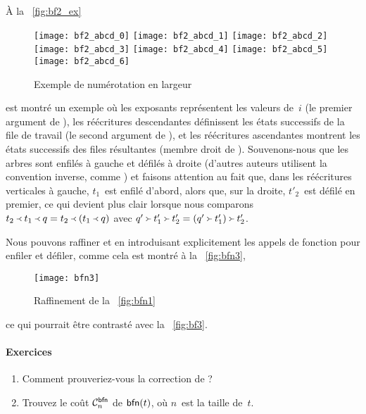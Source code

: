 À la \fig~\vref{fig:bf2_ex}
\begin{figure}
\centering
\texttt{[image: bf2\_abcd\_0]}
\texttt{[image: bf2\_abcd\_1]}
\texttt{[image: bf2\_abcd\_2]}
\texttt{[image: bf2\_abcd\_3]}
\texttt{[image: bf2\_abcd\_4]}
\texttt{[image: bf2\_abcd\_5]}
\texttt{[image: bf2\_abcd\_6]}
\caption{Exemple de numérotation en largeur}
\label{fig:bf2_ex}
\end{figure}
est montré un exemple où les exposants représentent les valeurs
de~\(i\) (le premier argument de
), les réécritures
descendantes définissent les états successifs de la file de travail
(le second argument de ),
et les réécritures ascendantes montrent les états successifs des files
résultantes (membre droit de
). Souvenons-nous que les
arbres sont enfilés à gauche et défilés à droite (d'autres auteurs
utilisent la convention inverse, comme \cite{Okasaki_2000}) et faisons
attention au fait que, dans les réécritures verticales à gauche,
\(t_1\)~est enfilé d'abord, alors que, sur la droite, \(t'_2\)~est
défilé en premier, ce qui devient plus clair lorsque nous comparons
\(\enq{t_2}{\enq{t_1}{q}} =
\enq{t_2}{(\enq{t_1}{q})}\) avec
\(\deq{t'_2}{\deq{t'_1}{q'}} =
\deq{t'_2}{(\deq{t'_1}{q'})}\).

Nous pouvons raffiner 
et  en introduisant
explicitement les appels de fonction pour enfiler et défiler, comme
cela est montré à la \fig~\vref{fig:bfn3},
\begin{figure}[!t]
\centering
\texttt{[image: bfn3]}
\caption{Raffinement de la \fig~\vref{fig:bfn1}}
\label{fig:bfn3}
\end{figure}
ce qui pourrait être contrasté avec la \fig~\vref{fig:bf3}.

\paragraph{Exercices}
\begin{enumerate}

  \item Comment prouveriez-vous la correction de
  ?

\medskip

  \item Trouvez le coût \(\C{\fun{bfn}}{n}\) de \(\fun{bfn}(t)\), où
  \(n\)~est la taille
  de~\(t\).

\end{enumerate}

